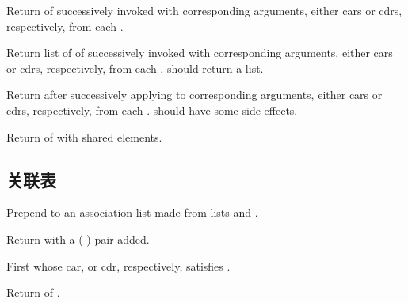 \begin{LIST}{1cm}
  {
    Return  of 
    successively invoked with corresponding arguments, either cars or
    cdrs, respectively, from each .
  }

  {
    Return list of  of
     successively invoked with corresponding arguments,
    either cars or cdrs, respectively, from each
    .  should return a list.
  }

  {
    Return  after successively applying
     to corresponding arguments, either cars or cdrs,
    respectively, from each .  should have
    some side effects.
  }

  {
    Return  of  with shared elements.
  }

\end{LIST}


\subsection{关联表} 
\label{section:关联表}
\begin{LIST}{1cm}

  {
    Prepend to  an association list made from
    lists  and .
  }

  {
    Return  with a (  )
    pair added.
  }

  {%
    First  whose car, or cdr, respectively, satisfies
    .
  }

  {
    Return  of .
  }

\end{LIST}


